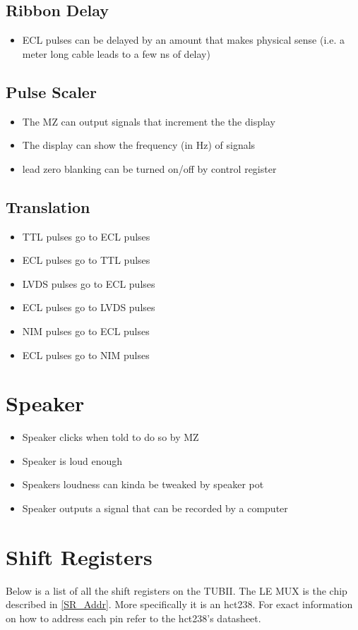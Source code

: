\documentclass[11pt,a4paper]{article}
\begin{document}
\subsection{Ribbon Delay}
\begin{itemize}
\item ECL pulses can be delayed by an amount that makes physical sense 
(i.e. a meter long cable leads to a few ns of delay)
\end{itemize}

\subsection{Pulse Scaler}
\begin{itemize}
\item The MZ can output signals that increment the the display
\item The display can show the frequency (in Hz) of signals
\item lead zero blanking can be turned on/off by control register
\end{itemize}
\subsection{Translation}
\begin{itemize}
\item TTL pulses go to ECL pulses
\item ECL pulses go to TTL pulses
\item LVDS pulses go to ECL pulses
\item ECL pulses go to LVDS pulses
\item NIM pulses go to ECL pulses
\item ECL pulses go to NIM pulses
\end{itemize}
\section{Speaker}
\begin{itemize}
\item Speaker clicks when told to do so by MZ
\item Speaker is loud enough
\item Speakers loudness can kinda be tweaked by speaker pot
\item Speaker outputs a signal that can be recorded by a computer
\end{itemize}

\section{Shift Registers}
Below is a list of all the shift registers on the TUBII. The LE MUX is the chip described in \ref{SR_Addr}. More specifically it is an hct238.  For exact information on how to address each pin refer to the hct238's datasheet.
\end{document}
